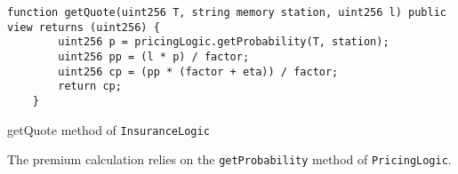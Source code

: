 \documentclass[10pt]{article}
\begin{document}
\begin{codefragment}[!h]
\begin{lstlisting}[language=Solidity]
function getQuote(uint256 T, string memory station, uint256 l) public view returns (uint256) {
        uint256 p = pricingLogic.getProbability(T, station);
        uint256 pp = (l * p) / factor;
        uint256 cp = (pp * (factor + eta)) / factor;
        return cp;
    }
\end{lstlisting}
    \caption{getQuote method of \texttt{InsuranceLogic}}
    \label{code:getQuote_method}
\end{codefragment}

The premium calculation relies on the \texttt{getProbability} method of \texttt{PricingLogic}.



\end{document}
